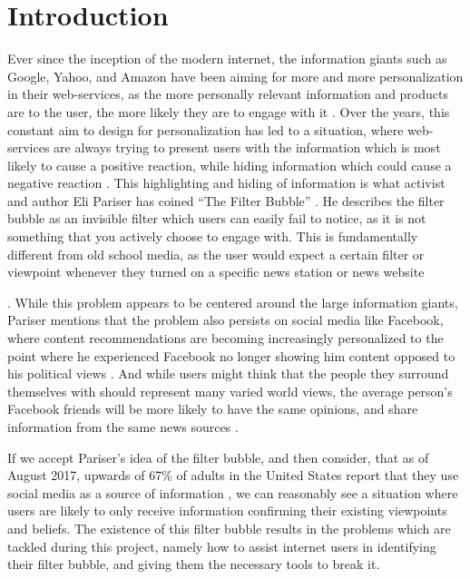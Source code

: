 \chapter{Introduction}\label{ch:intro}

Ever since the inception of the modern internet, the information giants such as
Google, Yahoo, and Amazon have been aiming for more and more personalization in
their web-services, as the more personally relevant information and products are
to the user, the more likely they are to engage with it 
\citep[p.8]{pariser2011filter}. Over the years, this constant aim to design for
personalization has led to a situation, where web-services are always trying to
present users with the information which is most likely to cause a positive
reaction, while hiding information which could cause a negative
reaction \citep{filterBubbleDef, Personality}. This highlighting and hiding of
information is what activist and author Eli Pariser has coined ``The Filter
Bubble'' \citep[p.9]{pariser2011filter}. He describes the filter bubble as an
invisible filter which users can easily fail to notice, as it is not something
that you actively choose to engage with. This is fundamentally different from
old school media, as the user would expect a certain filter or viewpoint
whenever they turned on a specific news station or news website

\citep[p.10]{pariser2011filter}. While this problem appears to be centered
around the large information giants, Pariser mentions that the problem also
persists on social media like Facebook, where content recommendations are
becoming increasingly personalized to the point where he experienced Facebook no
longer showing him content opposed to his political views
\citep{pariserTedSummary}. And while users might think that the people they
surround themselves with should represent many varied world views, the average
person's Facebook friends will be more likely to have the same opinions, and
share information from the same news sources \citep[p.66]{pariser2011filter}.\nl

If we accept Pariser's idea of the filter bubble, and then consider, that as of
August 2017, upwards of 67\% of adults in the United States report that they use
social media as a source of information \citep{journalism2017}, we can
reasonably see a situation where users are likely to only receive information confirming
their existing viewpoints and beliefs. The existence of this filter
bubble results in the problems which are tackled during this project, namely
how to assist internet users in identifying their filter bubble, and giving them
the necessary tools to break it.

